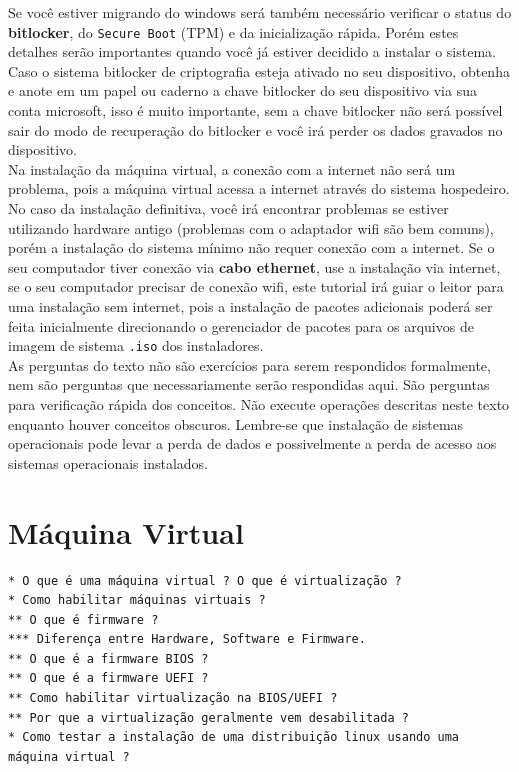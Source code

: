 \documentclass[12pt,a4paper]{article}
\begin{document}
\vspace{\baselineskip}

Se você estiver migrando do windows será também necessário verificar o status do \textbf{bitlocker}, do \texttt{Secure Boot} (TPM) e da inicialização rápida. Porém estes detalhes serão importantes quando você já estiver decidido a instalar o sistema. Caso o sistema bitlocker de criptografia esteja ativado no seu dispositivo, obtenha e anote em um papel ou caderno a chave bitlocker do seu dispositivo via sua conta microsoft, isso é muito importante, sem a chave bitlocker não será possível sair do modo de recuperação do bitlocker e você irá perder os dados gravados no dispositivo. \\

Na instalação da máquina virtual, a conexão com a internet não será um problema, pois a máquina virtual acessa a internet através do sistema hospedeiro. No caso da instalação definitiva, você irá encontrar problemas se estiver utilizando hardware antigo (problemas com o adaptador wifi são bem comuns), porém a instalação do sistema mínimo não requer conexão com a internet. Se o seu computador tiver conexão via \textbf{cabo ethernet}, use a instalação via internet, se o seu computador precisar de conexão wifi, este tutorial irá guiar o leitor para uma instalação sem internet, pois a instalação de pacotes adicionais poderá ser feita inicialmente direcionando o gerenciador de pacotes para os arquivos de imagem de sistema \texttt{.iso} dos instaladores.\\ 

As perguntas do texto não são exercícios para serem respondidos formalmente, nem são perguntas que necessariamente serão respondidas aqui. São perguntas para verificação rápida dos conceitos. Não execute operações descritas neste texto enquanto houver conceitos obscuros. Lembre-se que instalação de sistemas operacionais pode levar a perda de dados e possivelmente a perda de acesso aos sistemas operacionais instalados.


\section{Máquina Virtual}


\begin{lstlisting}
* O que é uma máquina virtual ? O que é virtualização ?
* Como habilitar máquinas virtuais ?
** O que é firmware ?
*** Diferença entre Hardware, Software e Firmware.
** O que é a firmware BIOS ?
** O que é a firmware UEFI ?
** Como habilitar virtualização na BIOS/UEFI ?
** Por que a virtualização geralmente vem desabilitada ? 
* Como testar a instalação de uma distribuição linux usando uma máquina virtual ? 
\end{lstlisting}
\end{document}
